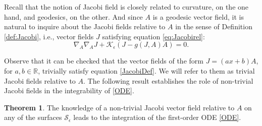 \documentclass{article}
\theoremstyle{remark}
\theoremstyle{definition}
\newtheorem{theorem}[remark]{Theorem}
\begin{document}
Recall that the notion of Jacobi field is closely related to curvature, on the one hand, and geodesics, on the other. And since $A$ is a geodesic vector field, it is natural to inquire about the Jacobi fields relative to $A$ in the sense of Definition \ref{def:Jacobi}, i.e., vector fields $J$ satisfying equation \eqref{eq:Jacobirel}:
\begin{equation}\label{JacobiDef}
    \nabla_{A} \nabla_{A}J+\mathcal{K}_{\epsilon}\left(J-g(J,A)A\right)=0.
\end{equation}

Observe that it can be checked that the vector fields of the form $J=(ax+b)A$, for $a,b\in \mathbb R$, trivially satisfy equation \eqref{JacobiDef}. We will refer to them as trivial Jacobi fields relative to $A$. The following result establishes the role of non-trivial Jacobi fields in the integrability of \eqref{ODE}.

\begin{theorem}\label{th:Jacobi}
The knowledge of a non-trivial Jacobi vector field relative to $A$ on any of the surfaces $\mathcal{S}_{\epsilon}$ leads to the integration of the first-order ODE \eqref{ODE}.
\end{theorem}
\end{document}
